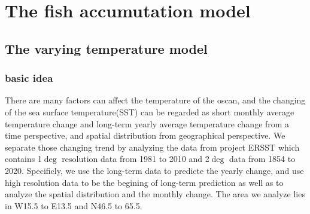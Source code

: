 \documentclass{mcmthesis}
\begin{document}
 \section{The fish accumutation model}
 \subsection{The varying temperature model}
 \cite{long2014fast}
  \subsubsection{basic idea}
    There are many factors can affect the temperature of the oscan, and the changing of the sea surface temperature(SST) can be 
    regarded as short monthly average temperature change and long-term yearly average temperature change from a time perspective, and spatial distribution from geographical perspective. We separate those changing trend by analyzing the data from project ERSST which contains 1$\deg$ resolution data from 1981 to 2010 and 2$\deg$ data from 1854 to 2020. Specificly, we use the long-term data to predicte the yearly change, and use high resolution data to be the begining of long-term prediction as well as to analyze the spatial distribution and the monthly change. The area we analyze lies in W15.5 to E13.5 and N46.5 to 65.5.
    
\end{document}
